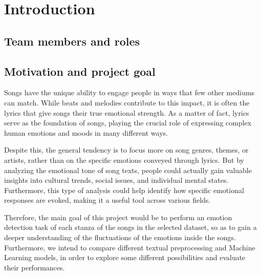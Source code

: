 \chapter*{Introduction}
\label{ch:Introduction}

\section*{Team members and roles}


\section*{Motivation and project goal}
Songs have the unique ability to engage people in ways that few other
mediums can match. While beats and melodies contribute to this impact,
it is often the lyrics that give songs their true emotional strength.
As a matter of fact, lyrics serve as the foundation of songs, playing
the crucial role of expressing complex human emotions and moods in many
different ways.

Despite this, the general tendency is to focus more on song genres, themes,
or artists, rather than on the specific emotions conveyed through lyrics.
But by analyzing the emotional tone of song texts, people could actually gain
valuable insights into cultural trends, social issues, and individual mental
states. Furthermore, this type of analysis could help identify how specific
emotional responses are evoked, making it a useful tool across various fields.

Therefore, the main goal of this project would be to perform an emotion
detection task of each stanza of the songs in the selected dataset, so as
to gain a deeper understanding of the fluctuations of the emotions inside the
songs. Furthermore, we intend to compare different textual preprocessing and
Machine Learning models, in order to explore some different possibilities and
evaluate their performances.
